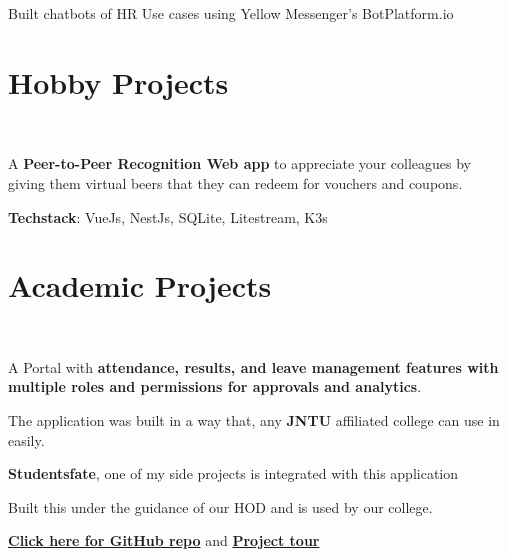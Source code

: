 \documentclass{deedy-resume-openfont}
\begin{document}
\begin{minipage}[t]{0.66\textwidth}
\begin{tightemize}
\item Built chatbots of HR Use cases using Yellow Messenger's BotPlatform.io
\end{tightemize}
\sectionsep


\section{Hobby Projects}
\\
\begin{tightemize}
\item A \textbf{Peer-to-Peer Recognition Web app} to appreciate your colleagues by giving them virtual beers that they can redeem for vouchers and coupons.
\item \textbf{Techstack}: VueJs, NestJs, SQLite, Litestream, K3s
\end{tightemize}
\sectionsep


\section{Academic Projects}
\\
\begin{tightemize}
\item A Portal with \textbf{attendance, results, and leave management features with multiple roles and permissions for approvals and analytics}.
\item The application was built in a way that, any \textbf{JNTU} affiliated college can use in easily. 
\item \textbf{Studentsfate}, one of my side projects is integrated with this application
\item Built this under the guidance of our HOD and is used by our college.
\item \textbf{\href{https://github.com/Prathap-Chandra/VIMS02/}{Click here for GitHub repo}} and \textbf{\href{https://www.youtube.com/watch?v=SD9KdLAw1OI}{Project tour}}
\end{tightemize}
\sectionsep


\end{minipage}
\end{document}
